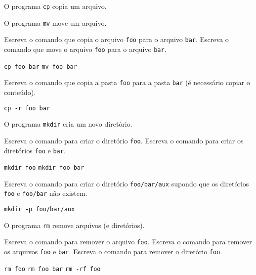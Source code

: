 \begin{Exercise}[label={0018}, difficulty={1}, origin={bash}]
  O programa \lstinline+cp+ copia um arquivo.

  O programa \lstinline+mv+ move um arquivo.

  \Question Escreva o comando que copia o arquivo \lstinline+foo+ para o
  arquivo \lstinline+bar+.
  \Question Escreva o comando que move o arquivo \lstinline+foo+ para o
  arquivo \lstinline+bar+.
\end{Exercise}
\begin{Answer}[ref={0018}]
  \Question \lstinline+cp foo bar+
  \Question \lstinline+mv foo bar+
\end{Answer}

\begin{Exercise}[label={0019}, difficulty={2}, origin={bash}]
  Escreva o comando que copia a pasta \lstinline+foo+ para a
  pasta \lstinline+bar+ (é necessário copiar o conteúdo).
\end{Exercise}
\begin{Answer}[ref={0019}]
  \Question \lstinline+cp -r foo bar+
\end{Answer}

\begin{Exercise}[label={0020}, difficulty={1}, origin={bash}]
  O programa \lstinline+mkdir+ cria um novo diretório.

  \Question Escreva o comando para criar o diretório \lstinline+foo+.
  \Question Escreva o comando para criar os diretórios \lstinline+foo+ e
  \lstinline+bar+.
\end{Exercise}
\begin{Answer}[ref={0020}]
  \Question \lstinline+mkdir foo+
  \Question \lstinline+mkdir foo bar+
\end{Answer}

\begin{Exercise}[label={0021}, difficulty={2}, origin={bash}]
  Escreva o comando para criar o diretório \lstinline+foo/bar/aux+ supondo que
  os diretórios \lstinline+foo+ e \lstinline+foo/bar+ não existem.
\end{Exercise}
\begin{Answer}[ref={0021}]
  \lstinline+mkdir -p foo/bar/aux+
\end{Answer}

\begin{Exercise}[label={0022}, difficulty={1}, origin={bash}]
  O programa \lstinline+rm+ remove arquivos (e diretórios).

  \Question Escreva o comando para remover o arquivo \lstinline+foo+.
  \Question Escreva o comando para remover os arquivos \lstinline+foo+ e
  \lstinline+bar+.
  \Question Escreva o comando para remover o diretório \lstinline+foo+.
\end{Exercise}
\begin{Answer}[ref={0022}]
  \lstinline+rm foo+
  \lstinline+rm foo bar+
  \lstinline+rm -rf foo+
\end{Answer}
